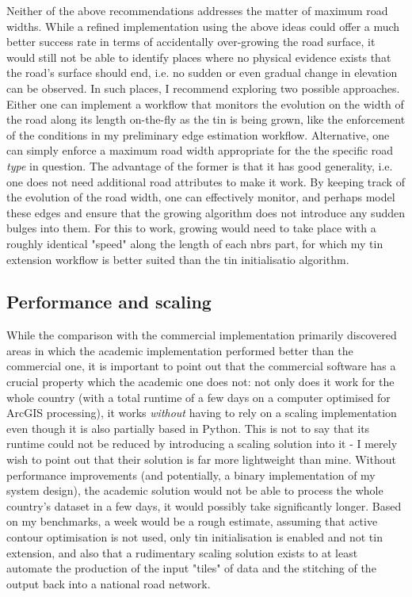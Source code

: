 Neither of the above recommendations addresses the matter of maximum road widths. While a refined implementation using the above ideas could offer a much better success rate in terms of accidentally over-growing the road surface, it would still not be able to identify places where no physical evidence exists that the road's surface should end, i.e. no sudden or even gradual change in elevation can be observed. In such places, I recommend exploring two possible approaches. Either one can implement a workflow that monitors the evolution on the width of the road along its length on-the-fly as the \ac{tin} is being grown, like the enforcement of the conditions in my preliminary edge estimation workflow. Alternative, one can simply enforce a maximum road width appropriate for the the specific road \textit{type} in question. The advantage of the former is that it has good generality, i.e. one does not need additional road attributes to make it work. By keeping track of the evolution of the road width, one can effectively monitor, and perhaps model these edges and ensure that the growing algorithm does not introduce any sudden bulges into them. For this to work, growing would need to take place with a roughly identical "speed" along the length of each \ac{nbrs} part, for which my \ac{tin} extension workflow is better suited than the \ac{tin} initialisatio algorithm.

\subsection{Performance and scaling}
\label{sub:improvementsperformance}

While the comparison with the commercial implementation primarily discovered areas in which the academic implementation performed better than the commercial one, it is important to point out that the commercial software has a crucial property which the academic one does not: not only does it work for the whole country (with a total runtime of a few days on a computer optimised for ArcGIS processing), it works \textit{without} having to rely on a scaling implementation even though it is also partially based in Python. This is not to say that its runtime could not be reduced by introducing a scaling solution into it - I merely wish to point out that their solution is far more lightweight than mine. Without performance improvements (and potentially, a binary implementation of my system design), the academic solution would not be able to process the whole country's dataset in a few days, it would possibly take significantly longer. Based on my benchmarks, a week would be a rough estimate, assuming that active contour optimisation is not used, only \ac{tin} initialisation is enabled and not \ac{tin} extension, and also that a rudimentary scaling solution exists to at least automate the production of the input "tiles" of data and the stitching of the output back into a national road network.

